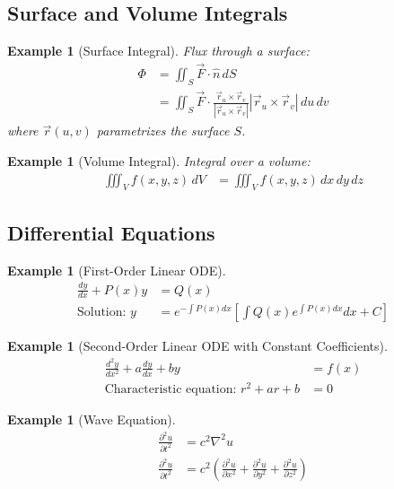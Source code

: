 \documentclass{article}
\newtheorem{example}[theorem]{Example}
\begin{document}
\subsection{Surface and Volume Integrals}

\begin{example}[Surface Integral]
Flux through a surface:
\begin{align*}
    \Phi &= \iint_S \vec{F} \cdot \hat{n} \, dS \\
    &= \iint_S \vec{F} \cdot \frac{\vec{r}_u \times \vec{r}_v}{|\vec{r}_u \times \vec{r}_v|} |\vec{r}_u \times \vec{r}_v| \, du \, dv
\end{align*}
where $\vec{r}(u,v)$ parametrizes the surface $S$.
\end{example}

\begin{example}[Volume Integral]
Integral over a volume:
\begin{align*}
    \iiint_V f(x,y,z) \, dV &= \iiint_V f(x,y,z) \, dx \, dy \, dz
\end{align*}
\end{example}

\subsection{Differential Equations}

\begin{example}[First-Order Linear ODE]
\begin{align*}
    \frac{dy}{dx} + P(x)y &= Q(x) \\
    \text{Solution: } y &= e^{-\int P(x)dx}\left[\int Q(x)e^{\int P(x)dx}dx + C\right]
\end{align*}
\end{example}

\begin{example}[Second-Order Linear ODE with Constant Coefficients]
\begin{align*}
    \frac{d^2y}{dx^2} + a\frac{dy}{dx} + by &= f(x) \\
    \text{Characteristic equation: } r^2 + ar + b &= 0
\end{align*}
\end{example}

\begin{example}[Wave Equation]
\begin{align*}
    \frac{\partial^2 u}{\partial t^2} &= c^2\nabla^2 u \\
    \frac{\partial^2 u}{\partial t^2} &= c^2\left(\frac{\partial^2 u}{\partial x^2} + \frac{\partial^2 u}{\partial y^2} + \frac{\partial^2 u}{\partial z^2}\right)
\end{align*}
\end{example}
\end{document}

